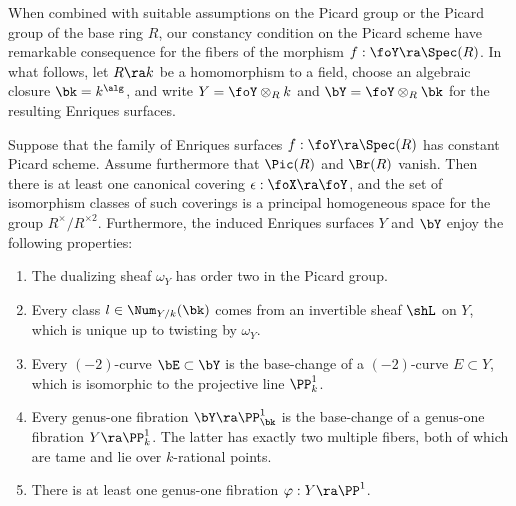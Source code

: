 When combined with suitable assumptions
on the Picard group or the Picard group of the base ring $R$, our constancy condition
on   the Picard scheme have remarkable consequence for the fibers of the
morphism $f:\foY\ra\Spec(R)$.
In what follows, let $R\ra k$ be a homomorphism
to a field, choose   an algebraic closure $\bk=k^\alg$,
and write  $Y=\foY\otimes_Rk$  and $\bY=\foY\otimes_R \bk$ for the resulting Enriques surfaces.

\begin{theorem}
\notready
\label{family with constant pic}
Suppose that the family of Enriques surfaces  $f:\foY\ra\Spec(R)$ has constant Picard scheme.
Assume furthermore  that  $\Pic(R)$  and  $\Br(R)$ vanish.
Then there is at least one canonical covering $\epsilon:\foX\ra \foY$, and
the set of isomorphism classes  of such coverings
is a principal homogeneous space for the  group
$R^\times/R^{\times 2}$. Furthermore, the induced Enriques surfaces $Y$ and $\bY$ enjoy the following properties:
\begin{enumerate}
\item
The dualizing sheaf $\omega_Y$   has order two in the Picard group.
\item
Every class $l\in \Num_{Y/k}(\bk)$ comes from an invertible sheaf $\shL$ on $Y$,
which is unique up to twisting by $\omega_Y$.
\item
Every $(-2)$-curve $\bE\subset\bY$ is the base-change of a $(-2)$-curve $E\subset Y$, which is isomorphic
to the projective line $\PP^1_k$.
\item
Every genus-one fibration $ \bY\ra\PP^1_{\bk}$ is the base-change of a genus-one fibration
$ Y\ra\PP^1_k$. The latter has exactly two multiple fibers, both of which are tame and lie over   $k$-rational points.
\item
There is at least one genus-one fibration $\varphi:Y\ra\PP^1$.
\end{enumerate}
\end{theorem}

